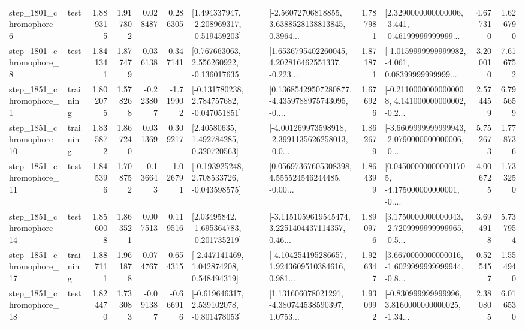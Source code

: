 \begin{tabular}{llrrrrllrlrr}
  step\_1801\_chromophore\_6 &      test &      1.889315 &    1.917802 &      0.028487 &  0.286305 &   [1.494337947, -2.208969317, -0.519459203] &  [-2.56072706818855, 3.6388528138813845, 0.3964... &       1.787981 &  [2.3290000000000006, -3.441, -0.46199999999999... &            4.677310 &          1.626790 \\
  step\_1801\_chromophore\_8 &      test &      1.841341 &    1.877479 &      0.036138 &  0.347141 &    [0.767663063, 2.556260922, -0.136017635] &  [1.6536795402260045, 4.202816462551337, -0.223... &       1.871871 &  [-1.0159999999999982, -4.061, 0.08399999999999... &            3.200010 &          7.616752 \\
  step\_1851\_chromophore\_1 &  training &      1.802075 &    1.578268 &     -0.223807 & -1.719902 &   [-0.131780238, 2.784757682, -0.047051851] &  [0.13685429507280877, -4.4359788975743095, -0.... &       1.676926 &  [-0.21100000000000008, 4.141000000000002, -0.2... &            2.574459 &          6.795659 \\
 step\_1851\_chromophore\_10 &  training &      1.835872 &    1.867240 &      0.031369 &  0.309217 &      [2.40580635, 1.492784285, 0.320720563] &  [-4.001269973598918, -2.3991135626258013, -0.0... &       1.862679 &  [-3.6609999999999943, -2.0790000000000006, -0.... &            5.752673 &          1.778736 \\
 step\_1851\_chromophore\_11 &      test &      1.845396 &    1.708752 &     -0.136643 & -1.026791 &   [-0.193925248, 2.708533726, -0.043598575] &  [0.05697367605308398, 4.555524546244485, -0.00... &       1.864399 &  [0.045000000000001705, -4.175000000000001, -0.... &            4.006725 &          1.733250 \\
 step\_1851\_chromophore\_14 &      test &      1.856008 &    1.863521 &      0.007513 &  0.119516 &    [2.03495842, -1.695364783, -0.201735219] &  [-3.1151059619545474, 3.2251404437114357, 0.46... &       1.890976 &  [3.1750000000000043, -2.7209999999999965, -0.5... &            3.694918 &          5.737954 \\
 step\_1851\_chromophore\_17 &  training &      1.887111 &    1.961878 &      0.074767 &  0.654315 &    [-2.447141469, 1.042874208, 0.548494319] &  [-4.104254195286657, 1.9243609510384616, 0.981... &       1.926347 &  [3.6670000000000016, -1.6029999999999944, -0.8... &            0.525457 &          1.554940 \\
 step\_1851\_chromophore\_18 &      test &      1.824470 &    1.733083 &     -0.091387 & -0.666916 &   [-0.619646317, 2.539102078, -0.801478053] &  [1.131606078021291, -4.380744538590397, 1.0753... &       1.930992 &  [-0.830999999999996, 3.8160000000000025, -1.34... &            2.380805 &          6.016530 \\

\end{tabular}
